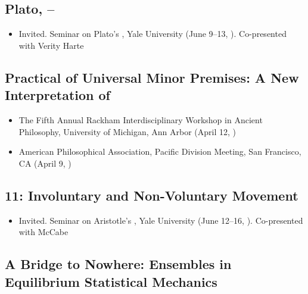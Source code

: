 \documentclass{rhelder3cv}
\begin{document}
\subsection{%
  \texorpdfstring{%
    Plato,  --%
  }{%
    Plato, Meno 70a1--73c5%
  }%
}

\begin{itemize}
  \item Invited.
    Seminar on Plato's ,
    Yale University
    (June 9--13, ).
    Co-presented with Verity Harte
\end{itemize}

\subsection{%
  \texorpdfstring{%
    Practical  of Universal Minor Premises:
    A New Interpretation of  %
  }{%
    Practical Nous of Universal Minor Premises:
    A New Interpretation of Nicomachean Ethics 6.11%
  }%
}

\begin{itemize}
  \item The Fifth Annual Rackham
    Interdisciplinary Workshop in Ancient Philosophy,
    University of Michigan, Ann Arbor
    (April 12, )
  \item American Philosophical Association,
    Pacific Division Meeting,
    San Francisco, CA
    (April 9, )
\end{itemize}

\subsection{%
  \texorpdfstring{%
     11: Involuntary and Non-Voluntary Movement%
  }{%
    De Motu Animalium 11: Involuntary and Non-Voluntary Movement%
  }%
}

\begin{itemize}
  \item Invited.
    Seminar on Aristotle's ,
    Yale University
    (June 12--16, ).
    Co-presented with  McCabe
\end{itemize}

\subsection{%
  A Bridge to Nowhere: Ensembles in Equilibrium Statistical Mechanics%
}
\end{document}
